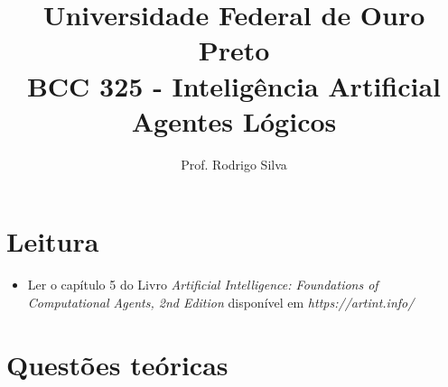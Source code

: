 \documentclass{article}
\title{\vspace{-2 cm}Universidade Federal de Ouro Preto \\ BCC 325 - Inteligência Artificial \\ Agentes Lógicos}
\author{Prof. Rodrigo Silva}
\date{}
\begin{document}
\maketitle



\section{Leitura}

\begin{itemize}
    \item Ler o capítulo 5 do Livro\textit{ Artificial Intelligence: Foundations of Computational Agents,  2nd Edition} disponível em \textit{https://artint.info/}
\end{itemize}

\section{Questões teóricas}
\end{document}
